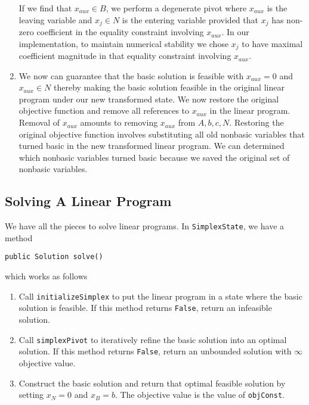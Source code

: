 \documentclass{article}
\newcommand{\javaCode}[1]{\texttt{#1}}
\begin{document}
\begin{enumerate}
    If we find that $x_{aux} \in B$, we perform a degenerate pivot where $x_{aux}$ is the leaving variable and $x_{j} \in N$ is the entering variable provided that $x_j$ has non-zero coefficient in the equality constraint involving $x_{aux}$. In our implementation, to maintain numerical stability we chose $x_j$ to have maximal coefficient magnitude in that equality constraint involving $x_{aux}$. 
    
    \item We now can guarantee that the basic solution is feasible with $x_{aux} = 0$ and $x_{aux} \in N$ thereby making the basic solution feasible in the original linear program under our new transformed state. We now restore the original objective function and remove all references to $x_{aux}$ in the linear program. Removal of $x_{aux}$ amounts to removing $x_{aux}$ from $A, b, c, N$. Restoring the original objective function involves substituting all old nonbasic variables that turned basic in the new transformed linear program. We can determined which nonbasic variables turned basic because we saved the original set of nonbasic variables. 
\end{enumerate}

\subsection{Solving A Linear Program}\label{Solving}
We have all the pieces to solve linear programs. In \javaCode{SimplexState}, we have a method
\begin{verbatim}
public Solution solve()
\end{verbatim}
which works as follows
\begin{enumerate}
    \item Call \javaCode{initializeSimplex} to put the linear program in a state where the basic solution is feasible. If this method returns \javaCode{False}, return an infeasible solution.
    \item Call \javaCode{simplexPivot} to iteratively refine the basic solution into an optimal solution. If this method returns \javaCode{False}, return an unbounded solution with $\infty$ objective value.
    \item Construct the basic solution and return that optimal feasible solution by setting $x_N = 0$ and $x_B = b$. The objective value is the value of \javaCode{objConst}.
\end{enumerate}
\end{document}

